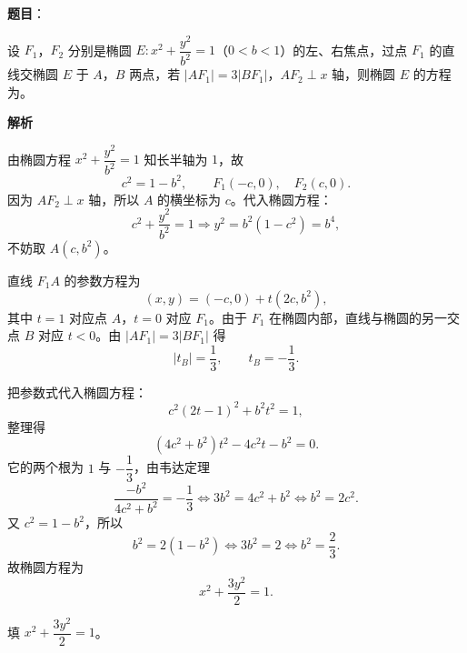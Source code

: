 \begin{answer}

\textbf{题目}：

设 $F_1$，$F_2$ 分别是椭圆 $E:x^2+\dfrac{y^2}{b^2}=1$（$0<b<1$）的左、右焦点，过点 $F_1$ 的直线交椭圆 $E$ 于 $A$，$B$ 两点，若 $|AF_1|=3|BF_1|$，$AF_2\perp x$ 轴，则椭圆 $E$ 的方程为\gkblank{}。

\textbf{解析}

由椭圆方程 $x^2+\dfrac{y^2}{b^2}=1$ 知长半轴为 $1$，故
\nopagebreak[4]
\[c^2=1-b^2,\qquad F_1(-c,0),\quad F_2(c,0).\]
因为 $AF_2\perp x$ 轴，所以 $A$ 的横坐标为 $c$。代入椭圆方程：
\nopagebreak[4]
\[c^2+\frac{y^2}{b^2}=1\Longrightarrow y^2=b^2(1-c^2)=b^4,\]
不妨取 $A(c,b^2)$。

直线 $F_1A$ 的参数方程为
\nopagebreak[4]
\[(x,y)=(-c,0)+t(2c,b^2),\]
其中 $t=1$ 对应点 $A$，$t=0$ 对应 $F_1$。由于 $F_1$ 在椭圆内部，直线与椭圆的另一交点 $B$ 对应 $t<0$。由 $|AF_1|=3|BF_1|$ 得
\nopagebreak[4]
\[|t_B|=\frac13,\qquad t_B=-\frac13 .\]

把参数式代入椭圆方程：
\nopagebreak[4]
\[c^2(2t-1)^2+b^2t^2=1,\]
整理得
\nopagebreak[4]
\[(4c^2+b^2)t^2-4c^2t-b^2=0 .\]
它的两个根为 $1$ 与 $-\dfrac13$，由韦达定理
\nopagebreak[4]
\[\frac{-b^2}{4c^2+b^2}=-\frac13
\iff 3b^2=4c^2+b^2
\iff b^2=2c^2 .\]
又 $c^2=1-b^2$，所以
\nopagebreak[4]
\[b^2=2(1-b^2)\iff 3b^2=2\iff b^2=\frac23 .\]
故椭圆方程为
\nopagebreak[4]
\[x^2+\frac{3y^2}{2}=1 .\]

填 $x^2+\dfrac{3y^2}{2}=1$。


\end{answer}
